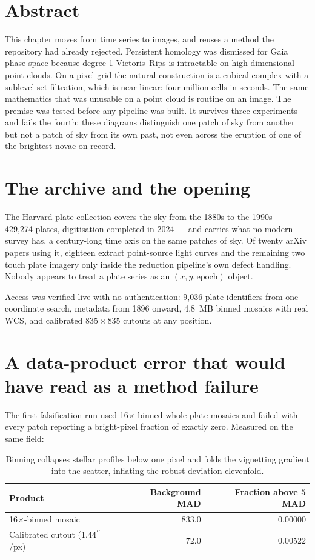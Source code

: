 \documentclass[11pt,a4paper]{report}
\providecommand{\arcsec}{\ensuremath{^{\prime\prime}}}
\begin{document}
\section*{Abstract}

This chapter moves from time series to images, and reuses a method the repository had already
rejected. Persistent homology was dismissed for Gaia phase space because degree-1
Vietoris--Rips is intractable on high-dimensional point clouds. On a pixel grid the natural
construction is a cubical complex with a sublevel-set filtration, which is near-linear: four
million cells in seconds. The same mathematics that was unusable on a point cloud is routine
on an image. The premise was tested before any pipeline was built. It survives three
experiments and fails the fourth: these diagrams distinguish one patch of sky from another
but not a patch of sky from its own past, not even across the eruption of one of the
brightest novae on record.

\section{The archive and the opening}

The Harvard plate collection covers the sky from the 1880s to the 1990s --- 429{,}274 plates,
digitisation completed in 2024 --- and carries what no modern survey has, a century-long time
axis on the same patches of sky. Of twenty arXiv papers using it, eighteen extract
point-source light curves and the remaining two touch plate imagery only inside the reduction
pipeline's own defect handling. Nobody appears to treat a plate series as an
$(x, y, \text{epoch})$ object.

Access was verified live with no authentication: 9{,}036 plate identifiers from one
coordinate search, metadata from 1896 onward, 4.8~MB binned mosaics with real WCS, and
calibrated $835\times835$ cutouts at any position.

\section{A data-product error that would have read as a method failure}

The first falsification run used 16$\times$-binned whole-plate mosaics and failed with every
patch reporting a bright-pixel fraction of exactly zero. Measured on the same field:

\begin{table}[h]
\centering
\small
\begin{tabular}{lrr}
\toprule
Product & Background MAD & Fraction above 5 MAD \\
\midrule
16$\times$-binned mosaic & 833.0 & 0.00000 \\
Calibrated cutout (1.44\arcsec/px) & 72.0 & 0.00522 \\
\bottomrule
\end{tabular}
\caption{Binning collapses stellar profiles below one pixel and folds the vignetting gradient
into the scatter, inflating the robust deviation elevenfold.}
\end{table}
\end{document}
